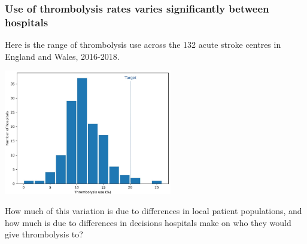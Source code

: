\begin{frame}
\frametitle{Use of thrombolysis rates varies significantly between hospitals}
Here is the range of thrombolysis use across the 132 acute stroke centres in England and Wales, 2016-2018.
\begin{center}
\includegraphics[width=0.55\textwidth]{./images/thrombolysis_by_hospital}
\end{center}

How much of this variation is due to differences in local patient populations, and how much is due to differences in decisions hospitals make on who they would give thrombolysis to?
\end{frame}